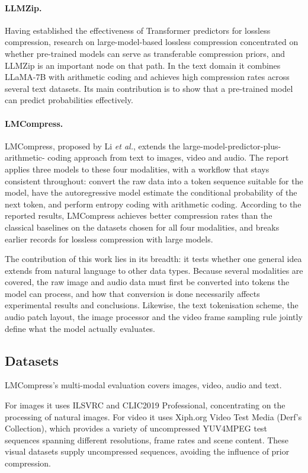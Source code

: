 \documentclass[12pt,a4paper]{article}
\begin{document}
\paragraph{LLMZip.}
Having established the effectiveness of Transformer predictors for lossless compression,
research on large-model-based lossless compression concentrated on whether pre-trained models
can serve as transferable compression priors, and LLMZip is an important node on that path.
In the text domain it combines LLaMA-7B with arithmetic coding and achieves high compression
rates across several text datasets. Its main contribution is to show that a pre-trained model
can predict probabilities effectively.

\paragraph{LMCompress.}
LMCompress, proposed by Li \emph{et al.}, extends the large-model-predictor-plus-arithmetic-
coding approach from text to images, video and audio. The report applies three models to
these four modalities, with a workflow that stays consistent throughout: convert the raw data
into a token sequence suitable for the model, have the autoregressive model estimate the
conditional probability of the next token, and perform entropy coding with arithmetic coding.
According to the reported results, LMCompress achieves better compression rates than the
classical baselines on the datasets chosen for all four modalities, and breaks earlier records
for lossless compression with large models.

The contribution of this work lies in its breadth: it tests whether one general idea extends
from natural language to other data types. Because several modalities are covered, the raw
image and audio data must first be converted into tokens the model can process, and how that
conversion is done necessarily affects experimental results and conclusions. Likewise, the
text tokenisation scheme, the audio patch layout, the image processor and the video frame
sampling rule jointly define what the model actually evaluates.

\subsection{Datasets}

LMCompress's multi-modal evaluation covers images, video, audio and text.

For images it uses ILSVRC and CLIC2019 Professional, concentrating on the processing of
natural images. For video it uses Xiph.org Video Test Media (Derf's Collection), which
provides a variety of uncompressed YUV4MPEG test sequences spanning different resolutions,
frame rates and scene content. These visual datasets supply uncompressed sequences, avoiding
the influence of prior compression.
\end{document}
